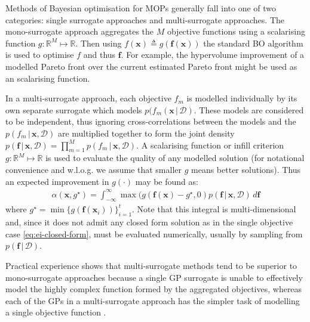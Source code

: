 \documentclass[conference]{IEEEtran}
\newcommand{\nobj}{M}
\newcommand{\defn}{\triangleq}
\newcommand\gp{GP\xspace}
\newcommand{\given}{\,|\,}
\newcommand{\bx}{\mathbf{x}}
\newcommand{\bff}{\mathbf{f}}
\newcommand{\data}{\mathcal{D}}
\begin{document}

Methods of Bayesian optimisation for MOPs generally fall into one of two
categories: single surrogate approaches and multi-surrogate approaches. The
mono-surrogate approach aggregates the $\nobj$ objective functions using a
scalarising function $g : \mathbb{R}^\nobj \mapsto \mathbb{R}$. Then using
$f(\bx) \defn g(\bff(\bx))$ the standard BO algorithm is used to optimise
$f$ and thus $\bff$. For example, the hypervolume improvement of a modelled
Pareto front over the current estimated Pareto front might be used as an
scalarising function. 



In a multi-surrogate approach, each objective $f_m$ is modelled
individually by its own separate surrogate which models
$p(f_m(\bx \given \data)$. These models are considered to be independent,
thus ignoring cross-correlations between the models and the
$p(f_m \given \bx, \data)$ are multiplied together to form the joint
density
$p(\bff \given \bx, \data) = \prod_{m=1}^\nobj p(f_m \given \bx, \data) $.
A scalarising function or infill criterion
$g : \mathbb{R}^\nobj \mapsto \mathbb{R}$ is used to evaluate the quality
of any modelled solution (for notational convenience and w.l.o.g.{} we
assume that smaller $g$ means better solutions). Thus an expected
improvement in $g(\cdot)$ may be found as:
\begin{align}
  \label{eq:EI-g}
    \alpha(\bx, g^\star) = \int_{-\infty}^\infty  \max(g(\bff(\bx) -
  g^\star, 0) p(\bff \given \bx,
  \data)\,d\bff
\end{align}
where $g^\star =  \min \{g(\bff(\bx_i))\}_{i=1}^t$.  Note that this
integral is multi-dimensional and, since it does not admit any closed form
solution as in the single objective case \eqref{eq:ei-closed-form},  must be
evaluated numerically, usually by sampling from $p(\bff \given \data )$.

Practical experience shows that multi-surrogate methods tend to be superior to mono-surrogate approaches because a single \gp surrogate is unable to effectively model the highly complex function formed by the aggregated objectives, whereas each of the GPs in a multi-surrogate approach has the simpler task of modelling a single objective function \cite{rahat2017alternative}.   
\end{document}
